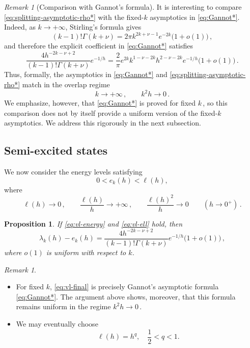 \documentclass[11pt]{amsart}
\numberwithin{equation}{section}
\newtheorem{proposition}[theorem]{Proposition}
\theoremstyle{remark}
\newtheorem{remark}[theorem]{Remark}
\begin{document}
		\begin{remark}[Comparison with Gannot's formula]\label{rem:Gannot}
		It is interesting to compare \eqref{eq:splitting-asymptotic-rho*} with the fixed-$k$
		asymptotics in \eqref{eq:Gannot*}. Indeed, as $k\to+\infty$, Stirling's formula gives
		\[
		(k-1)!\Gamma(k+\nu)
		=
		2\pi k^{2k+\nu-1}e^{-2k}
		\bigl(1+o(1)\bigr)\,,
		\]
		and therefore the explicit coefficient in \eqref{eq:Gannot*} satisfies
		\[
		\frac{4h^{-2k-\nu+2}}
		{(k-1)!\Gamma(k+\nu)}
		e^{-1/h}
		=
		\frac{2}{\pi}
		e^{2k}
		k^{1-\nu-2k}
		h^{2-\nu-2k}
		e^{-1/h}
		\bigl(1+o(1)\bigr)\,.
		\]
Thus, formally, the asymptotics in \eqref{eq:Gannot*} and \eqref{eq:splitting-asymptotic-rho*} match in the overlap regime 
		\[
		k\to+\infty\,,
		\qquad
		k^2h\to0\,.
		\]
		We emphasize, however, that \eqref{eq:Gannot*} is proved for fixed $k\,$,
		so this comparison does not by itself provide a uniform version of
		the fixed-$k$ asymptotics. We address this rigorously in the next subsection.
	\end{remark}
	
	
	
	
\subsection{Semi-excited states}\label{subsec:vl-regime}

We now consider the energy levels satisfying
\begin{equation}\label{eq:vl-energy}
	0<e_k(h)<\ell(h),
\end{equation}
where
\begin{equation}\label{eq:vl-ell}
	\ell(h)\longrightarrow0\,,
	\qquad
	\frac{\ell(h)}{h}\longrightarrow+\infty\,,
	\qquad
	\frac{\ell(h)^2}{h}\longrightarrow0
	\qquad (h\to0^+)\,.
\end{equation}

\begin{proposition}\label{prop:excited-states}
If \eqref{eq:vl-energy} and \eqref{eq:vl-ell} hold, then
\begin{equation}\label{eq:vl-final}
	\lambda_k(h)-e_k(h)
	=
	\frac{4h^{-2k-\nu+2}}
	{(k-1)!\Gamma(k+\nu)}
	e^{-1/h}
	\bigl(1+o(1)\bigr)\,,
\end{equation}
where $o(1)$ is uniform with respect to $k$.
\end{proposition}
%
\begin{remark}\label{rem:vl-gannot}~ 
\begin{itemize}
\item For fixed $k$, \eqref{eq:vl-final} is precisely Gannot's asymptotic
formula \eqref{eq:Gannot*}. The argument above shows, moreover, that this formula remains
uniform in the regime
$	k^2h\longrightarrow0\,.$
\item We may eventually choose
\[\ell(h)=h^{q},\quad \frac12<q<1.
\]
\end{itemize}
\end{remark}
\end{document}
